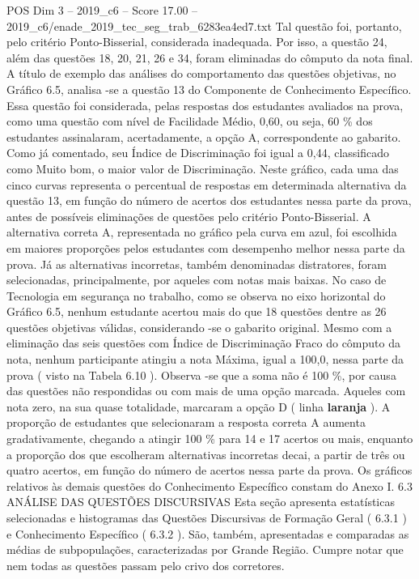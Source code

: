 \begin{textsample}{POS Dim 3 – 2019\_c6 – Score 17.00 – 2019\_c6/enade\_2019\_tec\_seg\_trab\_6283ea4ed7.txt}
Tal questão foi, portanto, pelo critério Ponto-Bisserial, considerada inadequada.
Por isso, a questão 24, além das questões 18, 20, 21, 26 e 34, foram eliminadas do cômputo da nota final.
A título de exemplo das análises do comportamento das questões objetivas, no Gráfico 6.5, analisa -se a questão 13 do Componente de Conhecimento Específico.
Essa questão foi considerada, pelas respostas dos estudantes avaliados na prova, como uma questão com nível de Facilidade Médio, 0,60, ou seja, 60 \% dos estudantes assinalaram, acertadamente, a opção A, correspondente ao gabarito.
Como já comentado, seu Índice de Discriminação foi igual a 0,44, classificado como Muito bom, o maior valor de Discriminação.
Neste gráfico, cada uma das cinco curvas representa o percentual de respostas em determinada alternativa da questão 13, em função do número de acertos dos estudantes nessa parte da prova, antes de possíveis eliminações de questões pelo critério Ponto-Bisserial.
A alternativa correta A, representada no gráfico pela curva em azul, foi escolhida em maiores proporções pelos estudantes com desempenho melhor nessa parte da prova.
Já as alternativas incorretas, também denominadas distratores, foram selecionadas, principalmente, por aqueles com notas mais baixas.
No caso de Tecnologia em segurança no trabalho, como se observa no eixo horizontal do Gráfico 6.5, nenhum estudante acertou mais do que 18 questões dentre as 26 questões objetivas válidas, considerando -se o gabarito original.
Mesmo com a eliminação das seis questões com Índice de Discriminação Fraco do cômputo da nota, nenhum participante atingiu a nota Máxima, igual a 100,0, nessa parte da prova ( visto na Tabela 6.10 ).
Observa -se que a soma não é 100 \%, por causa das questões não respondidas ou com mais de uma opção marcada.
Aqueles com nota zero, na sua quase totalidade, marcaram a opção D ( linha \textbf{laranja} ).
A proporção de estudantes que selecionaram a resposta correta A aumenta gradativamente, chegando a atingir 100 \% para 14 e 17 acertos ou mais, enquanto a proporção dos que escolheram alternativas incorretas decai, a partir de três ou quatro acertos, em função do número de acertos nessa parte da prova.
Os gráficos relativos às demais questões do Conhecimento Específico constam do Anexo I. 6.3 ANÁLISE DAS QUESTÕES DISCURSIVAS Esta seção apresenta estatísticas selecionadas e histogramas das Questões Discursivas de Formação Geral ( 6.3.1 ) e Conhecimento Específico ( 6.3.2 ).
São, também, apresentadas e comparadas as médias de subpopulações, caracterizadas por Grande Região.
Cumpre notar que nem todas as questões passam pelo crivo dos corretores.

\end{textsample}
